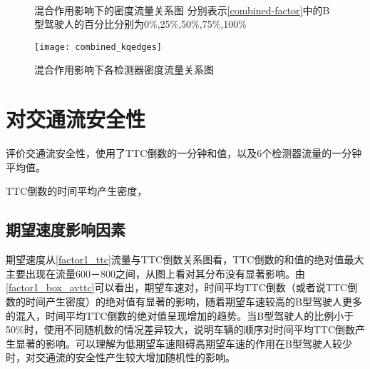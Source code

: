 \begin{figure}[!htb]%
\centering
{}%
\\%
%
\caption[A set of four sub-floats.]{混合作用影响下的密度流量关系图
分别表示\autoref{combined-factor}中的B型驾驶人的百分比分别为0\%,25\%,50\%,75\%,100\%}%
\label{combined_kq}%
\end{figure}

\begin{figure}[!htb]
\begin{center}
\texttt{[image: combined\_kqedges]}
\caption{混合作用影响下各检测器密度流量关系图}
\label{combined_kqedges}
\end{center}
\end{figure}

\section{对交通流安全性}

评价交通流安全性，使用了TTC倒数的一分钟和值，以及6个检测器流量的一分钟平均值。

TTC倒数的时间平均产生密度，

\subsection{期望速度影响因素}

期望速度从\autoref{factor1_ttc}流量与TTC倒数关系图看，TTC倒数的和值的绝对值最大主要出现在流量600－800之间，从图上看对其分布没有显著影响。由\autoref{factor1_box_avttc}可以看出，期望车速对，时间平均TTC倒数（或者说TTC倒数的时间产生密度）的绝对值有显著的影响，随着期望车速较高的B型驾驶人更多的混入，时间平均TTC倒数的绝对值呈现增加的趋势。当B型驾驶人的比例小于50\%时，使用不同随机数的情况差异较大，说明车辆的顺序对时间平均TTC倒数产生显著的影响。可以理解为低期望车速阻碍高期望车速的作用在B型驾驶人较少时，对交通流的安全性产生较大增加随机性的影响。

